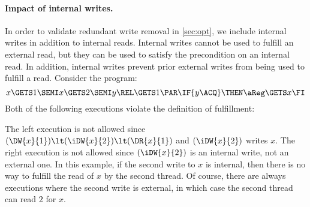 \paragraph{Impact of internal writes.}
In order to validate redundant write removal in \textsection\ref{sec:opt}, we
include internal writes in addition to internal reads.  Internal writes
cannot be used to fulfill an external read, but they can be used to satisfy
the precondition on an internal read.
In addition, internal writes prevent prior external writes from being used to fulfill
a read.  Consider the program:
\begin{displaymath}
  x\GETS 1\SEMI
  x\GETS 2\SEMI
  y\REL\GETS 1
  \PAR
  \IF{y\ACQ}\THEN \aReg\GETS x \FI
\end{displaymath}
Both of the following executions violate the definition of fulfillment:
\begin{displaymathsmall}
\begin{tikzcenter}[node distance=1em]
\end{tikzcenter}
 \qquad\qquad
\begin{tikzcenter}[node distance=1em]
\end{tikzcenter}
\end{displaymathsmall}
The left execution is not allowed since
\begin{math}
  (\DW{x}{1}) \lt (\iDW{x}{2}) \lt (\DR{x}{1})
\end{math}
and $(\iDW{x}{2})$ writes $x$.
The right execution is not allowed since $(\iDW{x}{2})$ is an internal
write, not an external one.
In this example, if the second write to $x$ is internal, then there is no way
to fulfill the read of $x$ by the second thread.  Of course, there are always
executions where the second write is external, in which case the second
thread can read $2$ for $x$.


